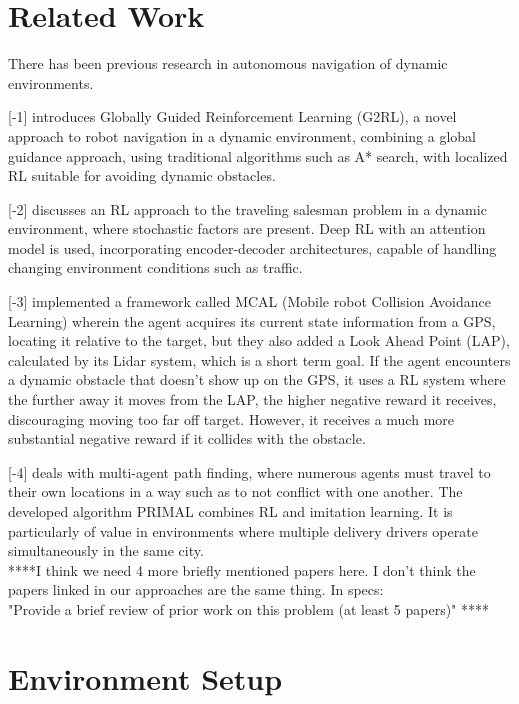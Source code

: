 \documentclass{article}
\begin{document}
        \section{Related Work}

        There has been previous research in autonomous navigation of dynamic environments. 
        
        [-1] introduces Globally Guided Reinforcement Learning (G2RL), a novel approach to robot navigation in a dynamic environment, combining a global guidance approach, using traditional algorithms such as A* search, with localized RL suitable for avoiding dynamic obstacles.
        
        [-2] discusses an RL approach to the traveling salesman problem in a dynamic environment, where stochastic factors are present. Deep RL with an attention model is used, incorporating encoder-decoder architectures, capable of handling changing environment conditions such as traffic. 
        
        [-3] implemented a framework called MCAL (Mobile robot Collision Avoidance Learning) wherein the agent acquires its current state information from a GPS, locating it relative to the target, but they also added a Look Ahead Point (LAP), calculated by its Lidar system, which is a short term goal. If the agent encounters a dynamic obstacle that doesn’t show up on the GPS, it uses a RL system where the further away it moves from the LAP, the higher negative reward it receives, discouraging moving too far off target. However, it receives a much more substantial negative reward if it collides with the obstacle.
        
        [-4] deals with multi-agent path finding, where numerous agents must travel to their own locations in a way such as to not conflict with one another. The developed algorithm PRIMAL combines RL and imitation learning. It is particularly of value in environments where multiple delivery drivers operate simultaneously in the same city.
        \\
        ****I think we need 4 more briefly mentioned papers here. I don't think the papers linked in our approaches are the same thing. In specs: \\
        "Provide a brief review of prior work on this problem (at least 5 papers)"
        ****
        \section{Environment Setup}
\end{document}
